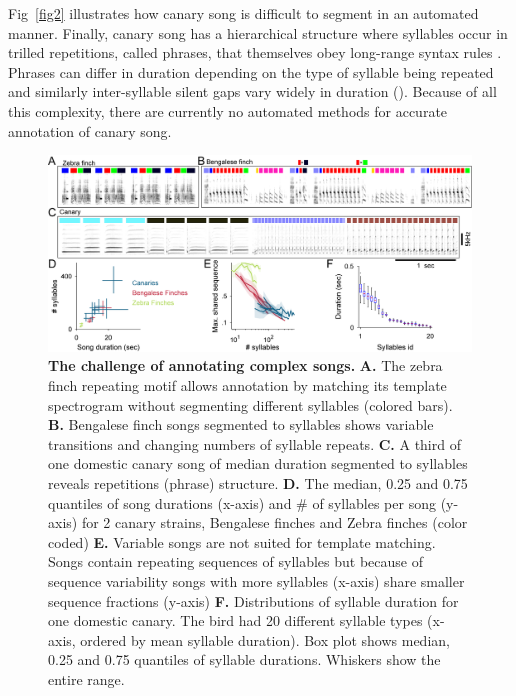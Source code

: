 \documentclass[10pt,letterpaper]{article}
\begin{document}
Fig~\ref{fig2} illustrates how canary song is difficult to segment in an automated manner. 
Finally, canary song has a hierarchical structure where syllables occur in trilled repetitions, called phrases, that themselves obey long-range syntax rules \cite{markowitz_long-range_2013,gardner_freedom_2005}. Phrases can differ in duration depending on the type of syllable being repeated and similarly inter-syllable silent gaps vary widely in duration (). Because of all this complexity, there are currently no automated methods for accurate annotation of canary song.

\begin{figure}[!h]
\includegraphics[scale=0.725]{Figures/fig1/Figure1_v4.png}
\caption{{\bf The challenge of annotating complex songs.}
\textbf{A.} The zebra finch repeating motif allows annotation by matching its template spectrogram without segmenting different syllables (colored bars).
\textbf{B.} Bengalese finch songs segmented to syllables shows variable transitions and changing numbers of syllable repeats.
\textbf{C.} A third of one domestic canary song of median duration segmented to syllables reveals repetitions (phrase) structure.  
\textbf{D.} The median, 0.25 and 0.75 quantiles of song durations (x-axis) and # of syllables per song (y-axis) for 2 canary strains, Bengalese finches and Zebra finches (color coded)
\textbf{E.} Variable songs are not suited for template matching. Songs contain repeating sequences of syllables but because of sequence variability songs with more syllables (x-axis) share smaller sequence fractions (y-axis)
\textbf{F.} Distributions of syllable duration for one domestic canary. The bird had 20 different syllable types (x-axis, ordered by mean syllable duration). Box plot shows median, 0.25 and 0.75 quantiles of syllable durations. Whiskers show the entire range.}
\label{fig1}
\end{figure} 
\end{document}
